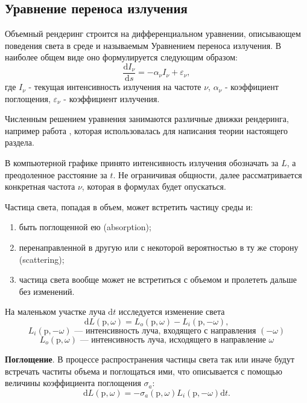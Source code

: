 \subsection{Уравнение переноса излучения}
\label{sec:rte}

Объемный рендеринг строится на дифференциальном уравнении, описывающем поведения света в среде и называемым Уравнением переноса излучения. В наиболее общем виде оно формулируется следующим образом:
%
\begin{equation}
	\label{eq:phys_rte}
	\frac{\mathrm dI_\nu}{\mathrm ds} = - \alpha_\nu I_\nu + \varepsilon_\nu,
\end{equation}
%
где $I_\nu$ - текущая интенсивность излучения на частоте $\nu$, $\alpha_\nu$ - коэффициент поглощения, $\varepsilon_\nu$ - коэффициент излучения.

Численным решением уравнения занимаются различные движки рендеринга, например работа \cite{pbrt}, которая использовалась для написания теории настоящего раздела.

В компьютерной графике принято интенсивность излучения обозначать за $L$, а преодоленное расстояние за $t$. Не ограничивая общности, далее рассматривается конкретная частота $\nu$, которая в формулах будет опускаться.

Частица света, попадая в объем, может встретить частицу среды и:
%
\begin{enumerate}
	\item быть поглощенной ею (absorption);
	\item перенаправленной в другую или с некоторой вероятностью в ту же сторону (scattering);
	\item частица света вообще может не встретиться с объемом и пролететь дальше без изменений.
\end{enumerate}

На маленьком участке луча $\mathrm dt$ исследуется изменение света
\[
	\mathrm dL(\mathrm p, \omega) =
	L_o(\mathrm p, \omega) - L_i(\mathrm p, -\omega),
\]
\[
	L_i(\mathrm p, -\omega) \text{ --- интенсивность луча, входящего с направления } (-\omega)
\]
\[
	L_o(\mathrm p, \omega) \text{ --- интенсивность луча, исходящего в направление } \omega
\]

\textbf{Поглощение}. В процессе распространения частицы света так или иначе будут встречать частиты объема и поглощаться ими, что описывается с помощью величины коэффициента поглощения $\sigma_a$:
%
\begin{equation}
	\label{eq:dl_absorption}
	\mathrm dL(\mathrm p, \omega) = -\sigma_a(\mathrm p, \omega) L_i(\mathrm p, -\omega) \mathrm dt.
\end{equation}

